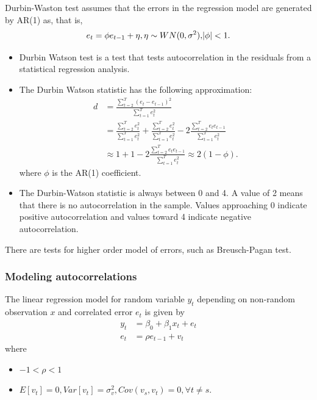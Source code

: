 \begin{refsection}
\begin{remark}
	Durbin-Waston test assumes that the errors
	in the regression model are generated by AR(1) as, that is,
	$$e_{t} = \phi e_{t-1} + \eta,\eta\sim WN(0,\sigma^2),\abs{\phi}<1.$$
\end{remark}

\begin{remark}[interpretation]\hfill
	\begin{itemize}
		\item Durbin Watson test is a test that tests  autocorrelation in the residuals from a statistical regression analysis.
		\item The Durbin Watson statistic has the following approximation:
		\begin{align*}
		d &= \frac{\sum_{t=2}^T (e_t - e_{t-1})^2}{\sum_{t=1}^T e_t^2} \\
		  &= \frac{\sum_{t=2}^T e_t^2}{\sum_{t=1}^T e_t^2}+\frac{\sum_{t=2}^T e_t^2}{\sum_{t=1}^T e_t^2} - 2\frac{\sum_{t=2}^T e_te_{t-1}}{\sum_{t=1}^T e_t^2} \\
		  &\approx 1 + 1 - 2\frac{\sum_{t=2}^T e_te_{t-1}}{\sum_{t=1}^T e_t^2}\approx 2(1 - \phi).
		\end{align*}
		where $\phi$ is the AR(1) coefficient.
		\item The Durbin-Watson statistic is always between 0 and 4. A value of 2 means that there is no autocorrelation in the sample. Values approaching 0 indicate positive autocorrelation and values toward 4 indicate negative autocorrelation.
	\end{itemize}
\end{remark}

\begin{remark}
	There are tests for higher order model of errors, such as Breusch-Pagan test.
\end{remark}


\subsubsection{Modeling autocorrelations}



\begin{definition}\cite[361]{hill2010principles}
The linear regression model for random variable $y_t$ depending on non-random observation $x$ and correlated error $e_t$ is given by 	
\begin{align*}
y_t &= \beta_0 + \beta_1 x_t + e_t \\
e_t & = \rho e_{t-1} + v_t
\end{align*}
where	
\begin{itemize}
	\item $-1< \rho < 1$
	\item $E[v_t] = 0, Var[v_t] = \sigma_v^2, Cov(v_s,v_t) = 0, \forall t\neq s$.
\end{itemize}
\end{definition}


\end{refsection}
